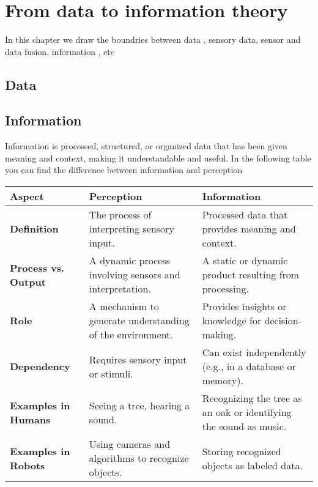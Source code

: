 \chapter{From data to information theory}
In this chapter we  draw the boundries between data , sensory data, sensor and data fusion, information , etc
\section{Data}

\section{Information} Information is processed, structured, or organized data that has been given meaning and context, making it understandable and useful. In the following table you can find the difference between information and perception
        \begin{tabular}{|l|l|l|}
            \hline
            \textbf{Aspect} & \textbf{Perception} & \textbf{Information} \\ \hline
            \textbf{Definition} & The process of interpreting sensory input. & Processed data that provides meaning and context. \\ \hline
            \textbf{Process vs. Output} & A dynamic process involving sensors and interpretation. & A static or dynamic product resulting from processing. \\ \hline
            \textbf{Role} & A mechanism to generate understanding of the environment. & Provides insights or knowledge for decision-making. \\ \hline
            \textbf{Dependency} & Requires sensory input or stimuli. & Can exist independently (e.g., in a database or memory). \\ \hline
            \textbf{Examples in Humans} & Seeing a tree, hearing a sound. & Recognizing the tree as an oak or identifying the sound as music. \\ \hline
            \textbf{Examples in Robots} & Using cameras and algorithms to recognize objects. & Storing recognized objects as labeled data. \\ \hline
        \end{tabular}

